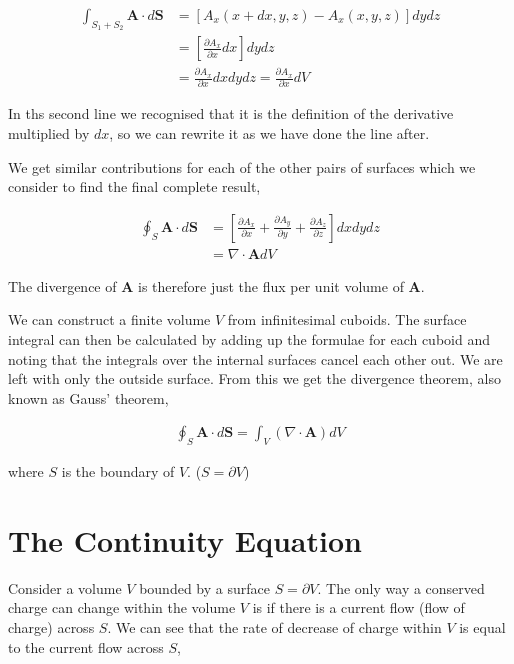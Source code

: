 \documentclass[11pt]{amsart}
\begin{document}
\begin{align*}
  \int_{S_1 + S_2} \mathbf{A} \cdot d\mathbf{S} &= \left[A_x(x + dx, y, z) - A_x(x, y, z)\right] dy dz \\
                                                &= \left[\frac{\partial A_x}{\partial x} dx\right] dy dz \\
                                                &= \frac{\partial A_x}{\partial x} dx dy dz = \frac{\partial A_x}{\partial x} dV
\end{align*}

In ths second line we recognised that it is the definition of the derivative multiplied by $dx$, so we can rewrite it as we have done the line after.

We get similar contributions for each of the other pairs of surfaces which we consider to find the final complete result,

\begin{align*}
  \oint_S \mathbf{A} \cdot d\mathbf{S} &= \left[\frac{\partial A_x}{\partial x} + \frac{\partial A_y}{\partial y} + \frac{\partial A_z}{\partial z}\right] dx dy dz \\
                                       &= \nabla \cdot \mathbf{A} dV
\end{align*}

The divergence of $\mathbf{A}$ is therefore just the flux per unit volume of $\mathbf{A}$.

We can construct a finite volume $V$ from infinitesimal cuboids. The surface integral can then be calculated by adding up the formulae for each cuboid and noting that the integrals over the internal surfaces cancel each other out. We are left with only the outside surface. From this we get the divergence theorem, also known as Gauss' theorem,

\begin{align*}
  \oint_S \mathbf{A} \cdot d\mathbf{S} = \int_V (\nabla \cdot \mathbf{A}) dV
\end{align*}

where $S$ is the boundary of $V$. ($S = \partial V$)

\section{The Continuity Equation}

Consider a volume $V$ bounded by a surface $S = \partial V$. The only way a conserved charge can change within the volume $V$ is if there is a current flow (flow of charge) across $S$. We can see that the rate of decrease of charge within $V$ is equal to the current flow across $S$,
\end{document}
